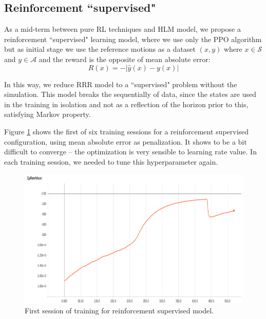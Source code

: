 

\subsection{Reinforcement ``supervised"}\label{sec:suprl}

As a mid-term between pure RL techniques and HLM model, we propose a reinforcement ``supervised" learning model, where we use only the PPO algorithm but as initial stage we use the reference motions as a dataset $(x, y)$ where $x \in \mathcal{S}$ and $y \in \mathcal{A}$ and the reward is the opposite of mean absolute error:
\begin{equation}
R(x) = - \lvert \hat y(x) - y(x) \rvert 
\end{equation}

 In this way, we reduce RRR model to a ``supervised" problem without the simulation. This model breaks the sequentially of data, since the states are used in the training in isolation and not as a reflection of the horizon prior to this, satisfying Markov property.

Figure \ref{fig:rlsupcurves} shows the first of six training sessions for a reinforcement supervised configuration, using mean absolute error as penalization. It shows to be a bit difficult to converge -- the optimization is very sensible to learning rate value. In each training session, we needed to tune this hyperparameter again.

\begin{figure}[!htbp]
	\centering
	\includegraphics[width=1.0\textwidth]{Cap6/rlsuprewardcurves.eps}
	\caption{First session of training for reinforcement supervised model.}
	\label{fig:rlsupcurves}
\end{figure}

